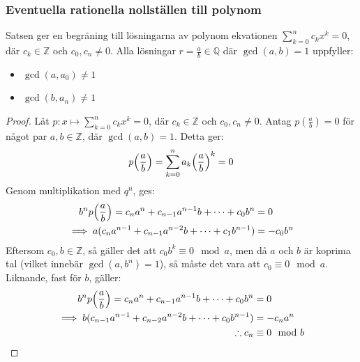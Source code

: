 \subsubsection{Eventuella rationella nollställen till polynom}
\begin{theorem}
	Satsen ger en begräning till lösningarna av polynom ekvationen $\sum_{k=0}^{n}c_kx^k=0$,
	där $c_k\in\mathbb{Z}$ och $c_0,c_n\neq0$. Alla lösningar $r=\frac{a}{b}\in\mathbb{Q}$
	där $\gcd(a,b)=1$ uppfyller:
	\begin{itemize}
		\item $\gcd(a,a_0)\neq1$
		\item $\gcd(b,a_n)\neq1$
	\end{itemize}

	\begin{proof}
		Låt $p:x\mapsto\sum_{k=0}^{n}c_kx^k=0$, där $c_k\in\mathbb{Z}$ och $c_0,c_n\neq0$.
		Antag $p(\frac{a}{b})=0$ för något par $a,b\in\mathbb{Z}$, där $\gcd(a,b)=1$.
		Detta ger:
		$$
			p\qty(\frac{a}{b})=\sum_{k=0}^{n}a_k\qty(\frac{a}{b})^k=0
		$$
		Genom multiplikation med $q^n$, ges:
		\begin{align*}
			b^np\qty(\frac{a}{b})=c_na^n+c_{n-1}a^{n-1}b+\dots+c_0b^n&=0\\
			\implies a(c_na^{n-1}+c_{n-1}a^{n-2}b+\dots+c_1b^{n-1})&=-c_0b^n
		\end{align*}
		Eftersom $c_0,b\in\mathbb{Z}$, så gäller det att $c_0b^k\equiv 0\mod a$,
		men då $a$ och $b$ är koprima tal (vilket innebär $\gcd(a,b^n)=1$), så måste
		det vara att $c_0\equiv 0\mod a$. Liknande, fast för $b$, gäller:
		\begin{align*}
			b^np\qty(\frac{a}{b})=c_na^n+c_{n-1}a^{n-1}b+\dots+c_0b^n&=0\\
			\implies b(c_{n-1}a^{n-1}+c_{n-2}a^{n-2}b+\dots+c_0b^{n-1})&=-c_na^n\\
			\therefore c_n&\equiv 0\mod b
		\end{align*}
	\end{proof}
\end{theorem}

